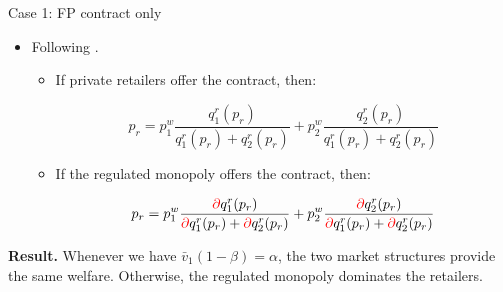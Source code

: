 \documentclass{class}
\begin{document}
\begin{frame}{Case 1: FP contract only}\label{CaseRamsey}

\begin{itemize}
    \item Following \cite{joskow2006retail}. \vfill

\begin{itemize}

    \item If private retailers offer the contract, then:

\begin{equation*}
 p_r = p_1^w  \frac{q_1^r(p_r)}{ q_1^r(p_r) + q_2^r(p_r) } + p_2^w \frac{ q_2^r(p_r)}{ q_1^r(p_r) + q_2^r(p_r) }
\end{equation*}

\vfill

\item If the regulated monopoly offers the contract, then:


 \begin{equation*}
 p_r = p_1^w \frac{ \textcolor{red}{\partial} q_1^{r}(p_r)}{ \textcolor{red}{\partial} q_1^{r}(p_r) + \textcolor{red}{\partial} q_2^{r}(p_r) } + p_2^w\frac{ \textcolor{red}{\partial} q_2^{r}(p_r)}{ \textcolor{red}{\partial} q_1^{r}(p_r) + \textcolor{red}{\partial} q_2^{r}(p_r) }
 \end{equation*}

   \end{itemize}
\end{itemize}    

\vfill

\textbf{Result.}  Whenever we have $\bar{v}_1 (1 - \beta) = \alpha$, the two market structures provide the same welfare. Otherwise, the regulated monopoly dominates the retailers.

\vfill

\hyperlink{RamseyOutside}{} 

\end{frame}



\end{document}
